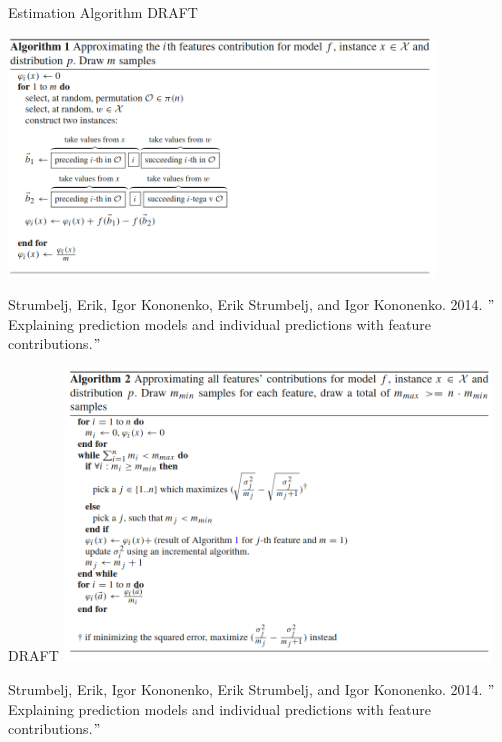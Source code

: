 \documentclass[11pt,compress,t,notes=noshow, xcolor=table]{beamer}
\begin{document}
\begin{vbframe}{Estimation Algorithm}
 DRAFT
\begin{center}
\includegraphics[width=0.85\textwidth]{figure_man/shapley-algorithm1.png}
\end{center}
  \tiny{Strumbelj, Erik, Igor Kononenko, Erik Strumbelj, and Igor Kononenko. 2014. $"$Explaining prediction models and individual predictions with feature contributions.$"$}
\framebreak


\begin{center}
  DRAFT
\includegraphics[width=0.85\textwidth]{figure_man/shapley-algorithm2.png}
\end{center}

\tiny{Strumbelj, Erik, Igor Kononenko, Erik Strumbelj, and Igor Kononenko. 2014. $"$Explaining prediction models and individual predictions with feature contributions.$"$}
 
\end{vbframe}
\end{document}
